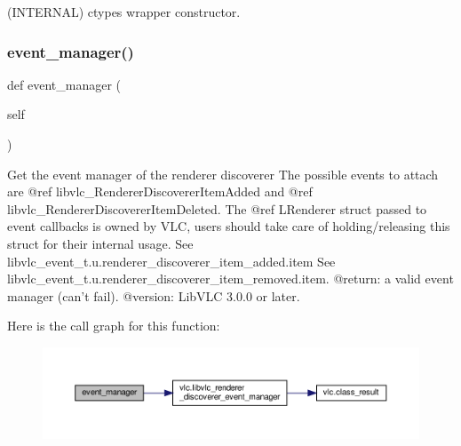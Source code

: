\begin{DoxyVerb}(INTERNAL) ctypes wrapper constructor.
\end{DoxyVerb}
 \mbox{\label{classvlc_1_1_renderer_discoverer_ab7c92812cd259eb8e4e4fd292b81bfaa}} 
\subsubsection{\texorpdfstring{event\+\_\+manager()}{event\_manager()}}
{\footnotesize\ttfamily def event\+\_\+manager (\begin{DoxyParamCaption}\item[{}]{self }\end{DoxyParamCaption})}

\begin{DoxyVerb}Get the event manager of the renderer discoverer
The possible events to attach are @ref libvlc_RendererDiscovererItemAdded
and @ref libvlc_RendererDiscovererItemDeleted.
The @ref L{Renderer} struct passed to event callbacks is owned by
VLC, users should take care of holding/releasing this struct for their
internal usage.
See libvlc_event_t.u.renderer_discoverer_item_added.item
See libvlc_event_t.u.renderer_discoverer_item_removed.item.
@return: a valid event manager (can't fail).
@version: LibVLC 3.0.0 or later.
\end{DoxyVerb}
 Here is the call graph for this function\+:
\nopagebreak
\begin{figure}[H]
\begin{center}
\leavevmode
\includegraphics[width=350pt]{classvlc_1_1_renderer_discoverer_ab7c92812cd259eb8e4e4fd292b81bfaa_cgraph}
\end{center}
\end{figure}
\mbox{\label{classvlc_1_1_renderer_discoverer_a4cd51e19135e5ad4a19eae3ea9c60537}} 

